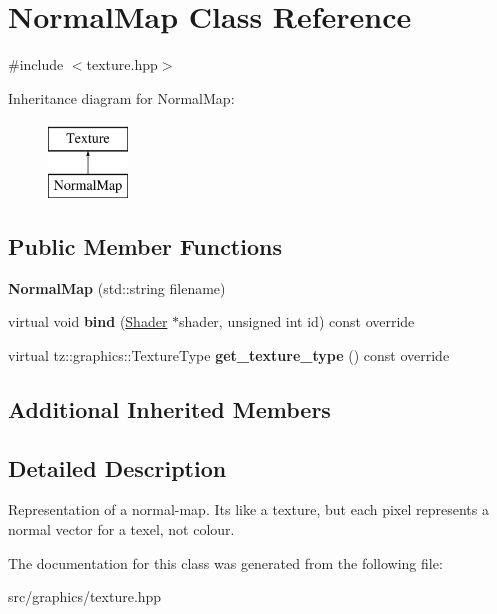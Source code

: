 \hypertarget{class_normal_map}{}\section{Normal\+Map Class Reference}
\label{class_normal_map}


{\ttfamily \#include $<$texture.\+hpp$>$}

Inheritance diagram for Normal\+Map\+:\begin{figure}[H]
\begin{center}
\leavevmode
\includegraphics[height=2.000000cm]{class_normal_map}
\end{center}
\end{figure}
\subsection*{Public Member Functions}
\begin{DoxyCompactItemize}
\item 
\mbox{\label{class_normal_map_ac654e582d00760ff4043bd9fde77881c}} 
{\bfseries Normal\+Map} (std\+::string filename)
\item 
\mbox{\label{class_normal_map_a9d23a2f3fc54373bc0e3e56940ead720}} 
virtual void {\bfseries bind} (\mbox{\hyperlink{class_shader}{Shader}} $\ast$shader, unsigned int id) const override
\item 
\mbox{\label{class_normal_map_a60bab20997073a76d916b67d520f89a9}} 
virtual tz\+::graphics\+::\+Texture\+Type {\bfseries get\+\_\+texture\+\_\+type} () const override
\end{DoxyCompactItemize}
\subsection*{Additional Inherited Members}


\subsection{Detailed Description}
Representation of a normal-\/map. It\textquotesingle{}s like a texture, but each pixel represents a normal vector for a texel, not colour. 

The documentation for this class was generated from the following file\+:\begin{DoxyCompactItemize}
\item 
src/graphics/texture.\+hpp\end{DoxyCompactItemize}
